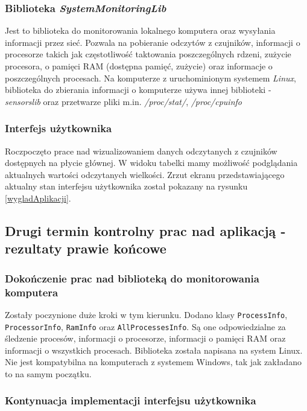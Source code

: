 \documentclass[a4paper]{article}
\begin{document}
\subsubsection{Biblioteka \textit{SystemMonitoringLib}}
Jest to biblioteka do monitorowania lokalnego komputera oraz wysyłania informacji przez sieć. Pozwala na pobieranie odczytów z czujników, informacji o procesorze takich jak częstotliwość taktowania poszczególnych rdzeni, zużycie procesora, o pamięci RAM (dostępna pamięć, zużycie) oraz informacje o poszczególnych procesach. Na komputerze z uruchominionym systemem \textit{Linux}, biblioteka do zbierania informacji o komputerze używa innej biblioteki - \textit{sensorslib} oraz przetwarze pliki m.in. \textit{/proc/stat/}, \textit{/proc/cpuinfo}

\subsubsection{Interfejs użytkownika}
Roczpoczęto prace nad wizualizowaniem danych  odczytanych z czujników dostępnych na płycie głównej.
W widoku tabelki mamy możliwość podglądania aktualnych wartości odczytanych wielkości. Zrzut ekranu przedstawiającego aktualny stan interfejsu użytkownika został pokazany na rysunku \ref{wygladAplikacji}.

\subsection{Drugi termin kontrolny prac nad aplikacją - rezultaty prawie końcowe}

\subsubsection{Dokończenie prac nad biblioteką do monitorowania komputera}

Zostały poczynione duże kroki w tym kierunku. Dodano klasy \texttt{ProcessInfo}, \texttt{ProcessorInfo}, \texttt{RamInfo} oraz \texttt{AllProcessesInfo}. Są one odpowiedzialne za śledzenie procesów, informacji o procesorze, informacji o pamięci
RAM oraz informacji o wszystkich procesach. Biblioteka została napisana na system Linux. Nie jest kompatybilna na komputerach z systemem Windows, tak jak zakładano to na samym początku. 

\subsubsection{Kontynuacja implementacji interfejsu użytkownika}
\end{document}
